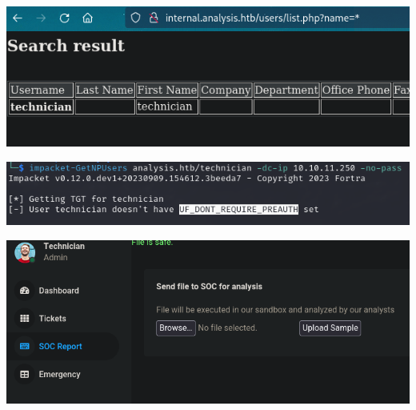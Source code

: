 \documentclass[a4paper]{article}
\begin{document}
              \begin{minipage}[c]{\textwidth}
          \centering
          \includegraphics[width=\textwidth]{src/issues/1 - ANALYSIS/issue11.png}
          \label{1:ANALYSIS:issue.md:issue11.png}
          \vspace{4ex}
        \end{minipage}
              \begin{minipage}[c]{\textwidth}
          \centering
          \includegraphics[width=\textwidth]{src/issues/1 - ANALYSIS/issue12.png}
          \label{1:ANALYSIS:issue.md:issue12.png}
          \vspace{4ex}
        \end{minipage}
              \begin{minipage}[c]{\textwidth}
          \centering
          \includegraphics[width=\textwidth]{src/issues/1 - ANALYSIS/issue13.png}
          \label{1:ANALYSIS:issue.md:issue13.png}
          \vspace{4ex}
        \end{minipage}
\end{document}
